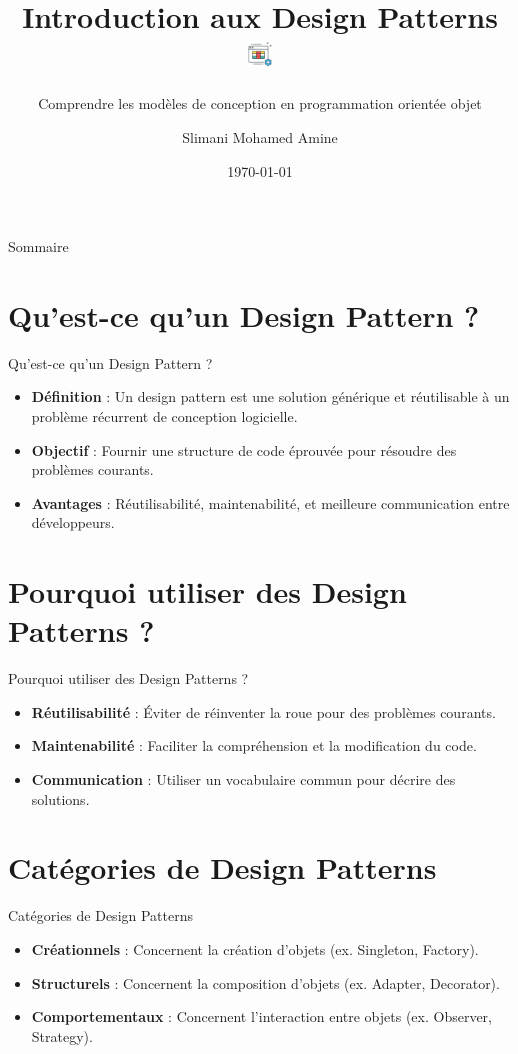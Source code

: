 \documentclass{clbeamer2024}
\title{
        Introduction aux Design Patterns
	\includegraphics[width=0.7cm]{logos/data.png} \hfill
}
\subtitle{Comprendre les modèles de conception en programmation orientée objet}
\author{Slimani Mohamed Amine}
\institute{EHTP}
\date{\today}
\begin{document}
	\setcounter{framenumber}{-1}
	\frame{\titlepage}
	
	
	
	\begin{frame}{Sommaire}
		\tableofcontents
	\end{frame}
	
	
	\section{Qu'est-ce qu'un Design Pattern ?}
	\begin{frame}{Qu'est-ce qu'un Design Pattern ?}
		\begin{itemize}
			\item \textbf{Définition} : Un design pattern est une solution générique et réutilisable à un problème récurrent de conception logicielle.
			\item \textbf{Objectif} : Fournir une structure de code éprouvée pour résoudre des problèmes courants.
			\item \textbf{Avantages} : Réutilisabilité, maintenabilité, et meilleure communication entre développeurs.
		\end{itemize}
	\end{frame}
	
	
	\section{Pourquoi utiliser des Design Patterns ?}
	\begin{frame}{Pourquoi utiliser des Design Patterns ?}
		\begin{itemize}
			\item \textbf{Réutilisabilité} : Éviter de réinventer la roue pour des problèmes courants.
			\item \textbf{Maintenabilité} : Faciliter la compréhension et la modification du code.
			\item \textbf{Communication} : Utiliser un vocabulaire commun pour décrire des solutions.
		\end{itemize}
	\end{frame}
	
	
	\section{Catégories de Design Patterns}
	\begin{frame}{Catégories de Design Patterns}
		\begin{itemize}
			\item \textbf{Créationnels} : Concernent la création d'objets (ex. Singleton, Factory).
			\item \textbf{Structurels} : Concernent la composition d'objets (ex. Adapter, Decorator).
			\item \textbf{Comportementaux} : Concernent l'interaction entre objets (ex. Observer, Strategy).
		\end{itemize}
	\end{frame}
	
\end{document}
